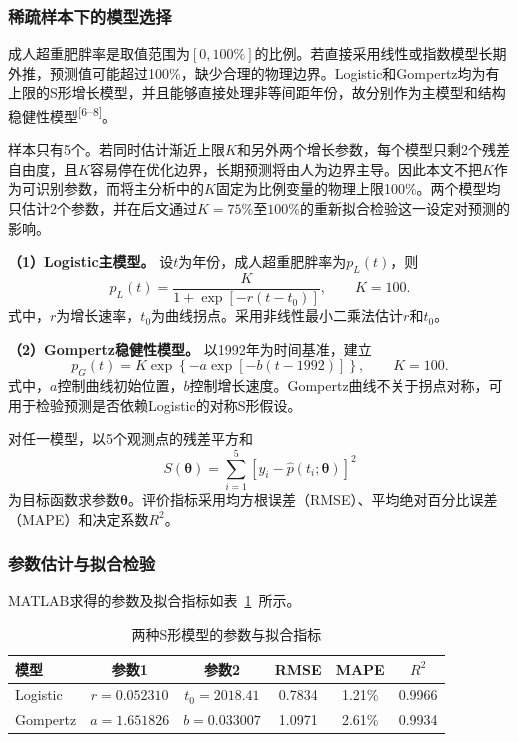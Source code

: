 \subsubsection{稀疏样本下的模型选择}

成人超重肥胖率是取值范围为$[0,100\%]$的比例。若直接采用线性或指数模型长期外推，预测值可能超过100\%，缺少合理的物理边界。Logistic和Gompertz均为有上限的S形增长模型，并且能够直接处理非等间距年份，故分别作为主模型和结构稳健性模型\textsuperscript{[6--8]}。

样本只有5个。若同时估计渐近上限$K$和另外两个增长参数，每个模型只剩2个残差自由度，且$K$容易停在优化边界，长期预测将由人为边界主导。因此本文不把$K$作为可识别参数，而将主分析中的$K$固定为比例变量的物理上限100\%。两个模型均只估计2个参数，并在后文通过$K=75\%$至$100\%$的重新拟合检验这一设定对预测的影响。

\textbf{（1）Logistic主模型。} 设$t$为年份，成人超重肥胖率为$p_L(t)$，则
\begin{equation}
p_L(t)=\frac{K}{1+\exp[-r(t-t_0)]},\qquad K=100.
\end{equation}
式中，$r$为增长速率，$t_0$为曲线拐点。采用非线性最小二乘法估计$r$和$t_0$。

\textbf{（2）Gompertz稳健性模型。} 以1992年为时间基准，建立
\begin{equation}
p_G(t)=K\exp\left\{-a\exp[-b(t-1992)]\right\},\qquad K=100.
\end{equation}
式中，$a$控制曲线初始位置，$b$控制增长速度。Gompertz曲线不关于拐点对称，可用于检验预测是否依赖Logistic的对称S形假设。

对任一模型，以5个观测点的残差平方和
\begin{equation}
S(\boldsymbol\theta)=\sum_{i=1}^{5}\left[y_i-\hat p(t_i;\boldsymbol\theta)\right]^2
\end{equation}
为目标函数求参数$\boldsymbol\theta$。评价指标采用均方根误差（RMSE）、平均绝对百分比误差（MAPE）和决定系数$R^2$。

\subsubsection{参数估计与拟合检验}

MATLAB求得的参数及拟合指标如表~\ref{tab:q1-fit}~所示。

\begin{table}[H]
\centering
\caption{两种S形模型的参数与拟合指标}
\label{tab:q1-fit}
\begin{tabular}{lccccc}
\toprule
模型 & 参数1 & 参数2 & RMSE & MAPE & $R^2$ \\
\midrule
Logistic & $r=0.052310$ & $t_0=2018.41$ & 0.7834 & 1.21\% & 0.9966 \\
Gompertz & $a=1.651826$ & $b=0.033007$ & 1.0971 & 2.61\% & 0.9934 \\
\bottomrule
\end{tabular}
\end{table}

